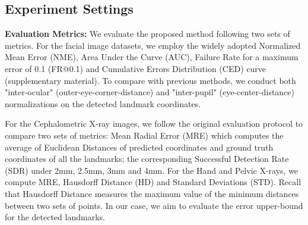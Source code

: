 \documentclass[runningheads]{llncs}
\begin{document}
\subsection{Experiment Settings}

\textbf{Evaluation Metrics:} We evaluate the proposed method following two sets of metrics. For the facial image datasets, we employ the widely adopted Normalized Mean Error (NME), Area Under the Curve (AUC), Failure Rate for a maximum error of 0.1 (FR@0.1) and Cumulative Errors Distribution (CED) curve (supplementary material). To compare with previous methods, we conduct both "inter-ocular" (outer-eye-corner-distance) and "inter-pupil" (eye-center-distance) normalizations on the detected landmark coordinates.

For the Cephalometric X-ray images, we follow the original evaluation protocol to compare two sets of metrics: Mean Radial Error (MRE) which computes the average of Euclidean Distances of predicted coordinates and ground truth coordinates of all the landmarks; the corresponding Successful Detection Rate (SDR) under 2mm, 2.5mm, 3mm and 4mm. For the Hand and Pelvic X-rays, we compute MRE, Hausdorff Distance (HD) and Standard Deviations (STD). Recall that Hausdorff Distance measures the maximum value of the minimum distances between two sets of points. In our case, we aim to evaluate the error upper-bound for the detected landmarks.
\end{document}
